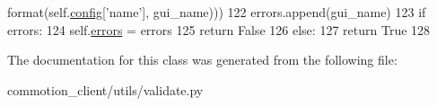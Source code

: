 \begin{DoxyCode}
      format(self.\hyperlink{classcommotion__client_1_1utils_1_1validate_1_1ClientConfig_acce323dd2fef1e3c2819cd0ed068cb67}{config}[\textcolor{stringliteral}{'name'}], gui\_name)))
122                     errors.append(gui\_name)
123         \textcolor{keywordflow}{if} errors:
124             self.\hyperlink{classcommotion__client_1_1utils_1_1validate_1_1ClientConfig_ae3bf78ef12869745641fcf0fcd7f422f}{errors} = errors
125             \textcolor{keywordflow}{return} \textcolor{keyword}{False}
126         \textcolor{keywordflow}{else}:
127             \textcolor{keywordflow}{return} \textcolor{keyword}{True}
128 

\end{DoxyCode}


The documentation for this class was generated from the following file\+:\begin{DoxyCompactItemize}
\item 
commotion\+\_\+client/utils/validate.\+py\end{DoxyCompactItemize}
